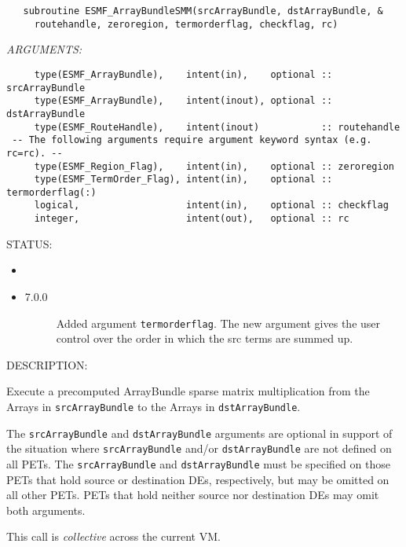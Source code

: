   
\begin{verbatim}   subroutine ESMF_ArrayBundleSMM(srcArrayBundle, dstArrayBundle, &
     routehandle, zeroregion, termorderflag, checkflag, rc)\end{verbatim}{\em ARGUMENTS:}
\begin{verbatim}     type(ESMF_ArrayBundle),    intent(in),    optional :: srcArrayBundle
     type(ESMF_ArrayBundle),    intent(inout), optional :: dstArrayBundle
     type(ESMF_RouteHandle),    intent(inout)           :: routehandle
 -- The following arguments require argument keyword syntax (e.g. rc=rc). --
     type(ESMF_Region_Flag),    intent(in),    optional :: zeroregion
     type(ESMF_TermOrder_Flag), intent(in),    optional :: termorderflag(:)
     logical,                   intent(in),    optional :: checkflag
     integer,                   intent(out),   optional :: rc\end{verbatim}
{\sf STATUS:}
   \begin{itemize}
   \item{}
   \item{}
   \begin{description}
   \item[7.0.0] Added argument {\tt termorderflag}.
                The new argument gives the user control over the order in which
                the src terms are summed up.
   \end{description}
   \end{itemize}
  
{\sf DESCRIPTION:\\ }


     Execute a precomputed ArrayBundle sparse matrix multiplication from the
     Arrays in {\tt srcArrayBundle} to the Arrays in {\tt dstArrayBundle}.
  
     The {\tt srcArrayBundle} and {\tt dstArrayBundle} arguments are optional in
     support of the situation where {\tt srcArrayBundle} and/or
     {\tt dstArrayBundle} are not defined on all PETs. The {\tt srcArrayBundle}
     and {\tt dstArrayBundle} must be specified on those PETs that hold source
     or destination DEs, respectively, but may be omitted on all other PETs.
     PETs that hold neither source nor destination DEs may omit both arguments.
  
     This call is {\em collective} across the current VM.
  
